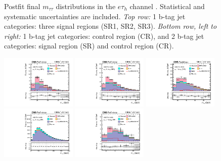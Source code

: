 \begin{figure}[ht]
\begin{center}
    \end{center}
    \caption[Postfit final $m_{\tau\tau}$ distributions in the $e\tau_{h}$ channel]{Postfit final $m_{\tau\tau}$ distributions in the $e\tau_{h}$ channel \cite{CMS-AN-20-213}. Statistical and systematic uncertainties are included. \textit{Top row:} 1 b-tag jet categories: three signal regions (SR1, SR2, SR3). \textit{Bottom row, left to right:} 1 b-tag jet categories: control region (CR), and 2 b-tag jet categories: signal region (SR) and control region (CR).}
    \label{fig:results_mtt_postfit_etall}
\end{figure}

\begin{figure}[ht]
    \begin{center}
        \includegraphics[width=0.32\textwidth]{figures/ch-13-results/em_all_1_post_prelim-yes.pdf}
        \includegraphics[width=0.32\textwidth]{figures/ch-13-results/em_all_2_post_prelim-yes.pdf}
        \includegraphics[width=0.32\textwidth]{figures/ch-13-results/em_all_3_post_prelim-yes.pdf}\\
        \includegraphics[width=0.32\textwidth]{figures/ch-13-results/em_all_4_post_prelim-yes.pdf}
        \includegraphics[width=0.32\textwidth]{figures/ch-13-results/em_all_5_post_prelim-yes.pdf}

\end{center}
\end{figure}
